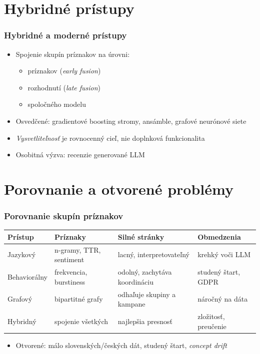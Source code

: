 \documentclass{beamer}
\newcommand{\emp}[1]{\textit{\alert{#1}}}
\begin{document}
\section{Hybridné prístupy}

\begin{frame}[fragile=singleslide]\frametitle{Hybridné a moderné prístupy}
\begin{itemize}
\item Spojenie skupín príznakov na úrovni:
	\begin{itemize}
	\item príznakov (\emph{early fusion})
	\item rozhodnutí (\emph{late fusion})
	\item spoločného modelu
	\end{itemize}
\item Osvedčené: gradientové boosting stromy, ansámble, grafové neurónové siete
\item \emp{Vysvetliteľnosť} je rovnocenný cieľ, nie doplnková funkcionalita
\item Osobitná výzva: recenzie generované LLM
\end{itemize}
\end{frame}


\section{Porovnanie a otvorené problémy}

\begin{frame}[fragile=singleslide]\frametitle{Porovnanie skupín príznakov}
\footnotesize
\begin{tabular}{@{}p{1.9cm}p{2.6cm}p{3.1cm}p{3.0cm}@{}}
\hline
\textbf{Prístup} & \textbf{Príznaky} & \textbf{Silné stránky} & \textbf{Obmedzenia} \\
\hline
Jazykový & n-gramy, TTR, sentiment & lacný, interpretovateľný & krehký voči LLM \\
Behaviorálny & frekvencia, burstiness & odolný, zachytáva koordináciu & studený štart, GDPR \\
Grafový & bipartitné grafy & odhaľuje skupiny a kampane & náročný na dáta \\
Hybridný & spojenie všetkých & najlepšia presnosť & zložitosť, preučenie \\
\hline
\end{tabular}
\vspace{2mm}
\begin{itemize}
\item Otvorené: málo slovenských/českých dát, studený štart, \emph{concept drift}
\end{itemize}
\end{frame}
\end{document}
